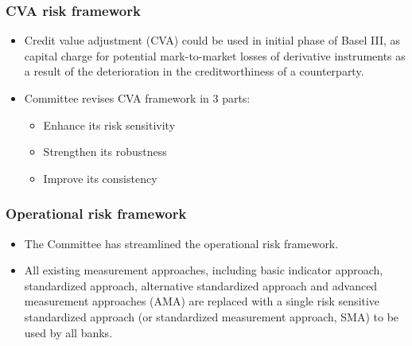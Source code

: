 \subsubsection{CVA risk framework}
\begin{itemize}
\item Credit value adjustment (CVA) could be used in initial phase of Basel III, as capital charge for potential mark-to-market losses of derivative instruments as a result of the deterioration in the creditworthiness of a counterparty.
\item Committee revises CVA framework in 3 parts:
    \begin{itemize}
    \item Enhance its risk sensitivity
    \item Strengthen its robustness
    \item Improve its consistency
    \end{itemize}
\end{itemize}


\subsubsection{Operational risk framework}
\begin{itemize}
\item The Committee has streamlined the operational risk framework.
\item All existing measurement approaches, including basic indicator approach, standardized approach, alternative standardized approach and advanced measurement approaches (AMA) are replaced with a single risk sensitive standardized approach (or standardized measurement approach, SMA) to be used by all banks.
\end{itemize}


